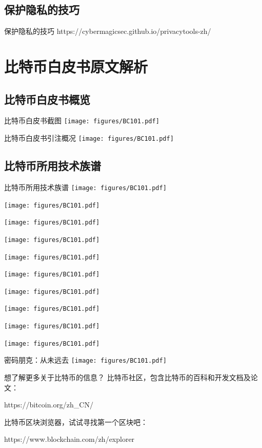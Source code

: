 \documentclass[11pt]{beamer}
\begin{document}
\subsection{保护隐私的技巧}
	
	\begin{frame}{保护隐私的技巧}
		\centering
		https://cybermagicsec.github.io/privacytools-zh/
	\end{frame}

\section{比特币白皮书原文解析}

\subsection{比特币白皮书概览}
\begin{frame}{比特币白皮书截图}
	\centering
	\texttt{[image: figures/BC101.pdf]}
\end{frame}

\begin{frame}{比特币白皮书引注概况}
	\centering
	\texttt{[image: figures/BC101.pdf]}
\end{frame}

\subsection{比特币所用技术族谱}

\begin{frame}[allowframebreaks]{比特币所用技术族谱}
	\centering
	\texttt{[image: figures/BC101.pdf]}
	
	\texttt{[image: figures/BC101.pdf]}
	
	\texttt{[image: figures/BC101.pdf]}
	
	\texttt{[image: figures/BC101.pdf]}
	
	\texttt{[image: figures/BC101.pdf]}
	
	\texttt{[image: figures/BC101.pdf]}
	
	\texttt{[image: figures/BC101.pdf]}
	
	\texttt{[image: figures/BC101.pdf]}
	
	\texttt{[image: figures/BC101.pdf]}
	
	\texttt{[image: figures/BC101.pdf]}
\end{frame}

\begin{frame}{密码朋克：从未远去}
	\centering
	\texttt{[image: figures/BC101.pdf]}
\end{frame}

%	





\begin{frame}{想了解更多关于比特币的信息？}
	\centering
比特币社区，包含比特币的百科和开发文档及论文：

https://bitcoin.org/zh\_CN/

\hfil

比特币区块浏览器，试试寻找第一个区块吧：

https://www.blockchain.com/zh/explorer

\end{frame}
\end{document}
